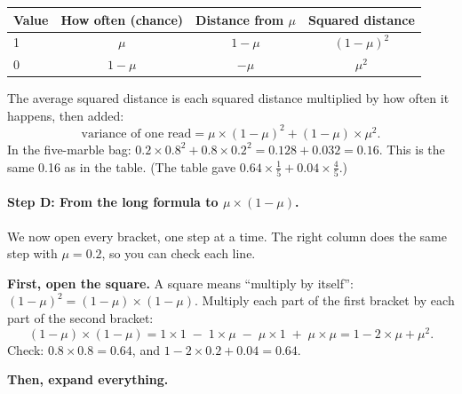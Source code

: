\begin{center}
\begin{tabular}{@{}lccc@{}}
\toprule
Value & How often (chance) & Distance from $\mu$ & Squared distance\\
\midrule
1 & $\mu$ & $1-\mu$ & $(1-\mu)^2$\\
0 & $1-\mu$ & $-\mu$ & $\mu^2$\\
\bottomrule
\end{tabular}
\end{center}

The average squared distance is each squared distance multiplied by how
often it happens, then added:
\[
\text{variance of one read} = \mu \times (1-\mu)^2 + (1-\mu) \times \mu^2 .
\]
In the five-marble bag: $0.2 \times 0.8^2 + 0.8 \times 0.2^2 = 0.128 +
0.032 = 0.16$. This is the same 0.16 as in the table. (The table gave
$0.64 \times \frac{1}{5} + 0.04 \times \frac{4}{5}$.)

\paragraph{Step D: From the long formula to $\mu \times (1-\mu)$.}
We now open every bracket, one step at a time. The right column does the
same step with $\mu = 0.2$, so you can check each line.

\textbf{First, open the square.} A square means ``multiply by itself'':
$(1-\mu)^2 = (1-\mu) \times (1-\mu)$. Multiply each part of the first
bracket by each part of the second bracket:
\[
(1-\mu) \times (1-\mu) = 1 \times 1 \;-\; 1 \times \mu \;-\; \mu \times 1
 \;+\; \mu \times \mu = 1 - 2 \times \mu + \mu^2 .
\]
Check: $0.8 \times 0.8 = 0.64$, and $1 - 2 \times 0.2 + 0.04 = 0.64$.

\textbf{Then, expand everything.}

